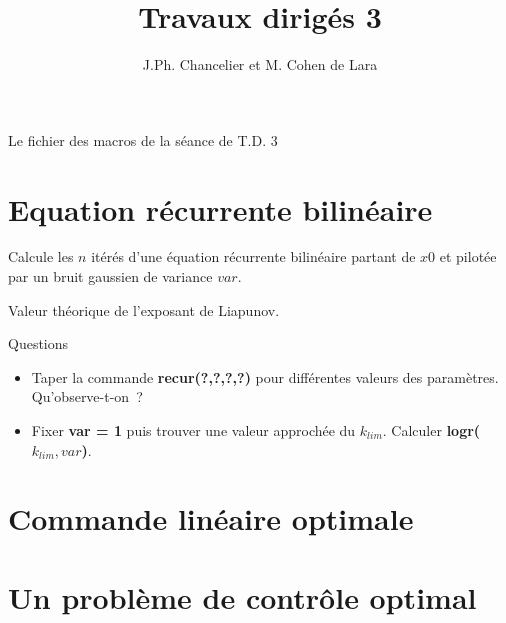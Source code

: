\textheight=660pt 
\textwidth=470pt 
\topmargin=-27pt 
\oddsidemargin=0pt 
\evensidemargin=0pt 
\title{Travaux dirig\'es 3}
\author{J.Ph. Chancelier et M. Cohen de Lara}

\maketitle 
\def\cmarg{\hspace{1cm}}

\def\tit#1{ \begin{center} \fbox{{\bf  #1}} \end{center}}
\centerline{Le fichier des macros de la s\'eance de T.D. 3}

\Mhlp

\Mtdinitt

\section{Equation r\'ecurrente bilin\'eaire}

\tit{recur}
Calcule les $n$ it\'er\'es d'une \'equation r\'ecurrente bilin\'eaire 
partant de $x0$ et pilot\'ee par un bruit gaussien de variance $var$.

\Mrecur

\tit{logr}
Valeur  th\'eorique de l'exposant de Liapunov.

\Mlogr

\centerline{{\sc Questions}}

\begin{itemize}
\item Taper la commande {\bf recur(?,?,?,?)} pour diff\'erentes valeurs des param\`etres. Qu'observe-t-on~?
\item Fixer {\bf var = 1} puis trouver une valeur approch\'ee du $k_{lim}$.
Calculer {\bf logr($k_{lim} , var$)}.
\end{itemize}
\bigskip


\section{Commande lin\'eaire optimale}

\Mcomric

\Mobsric

\Mexemple

\Mtest

\section{Un probl\`eme de contr\^ole optimal}

